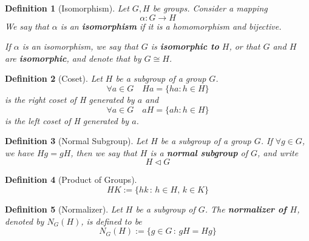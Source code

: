 \documentclass[9pt,landscape,a4paper]{article}
\newcommand{\hldefn}[1]{\textcolor{base16-eighties-magenta}{\textbf{#1}}}
\newcommand{\hlnoteb}[1]{\textcolor{base16-eighties-magenta}{\textbf{#1}}}
\theoremstyle{empty}
\newtheorem{defn}{Definition}
\begin{document}
\begin{multicols*}{5}
\begin{defn}[Isomorphism]
\label{defn:isomorphism}
  Let $G, H$ be groups. Consider a mapping
  \begin{equation*}
    \alpha: G \to H
  \end{equation*}
  We say that $\alpha$ is an \hlnoteb{isomorphism} if it is a homomorphism and bijective.

  If $\alpha$ is an isomorphism, we say that $G$ is \hldefn{isomorphic to} $H$, or that $G$ and $H$ are \hldefn{isomorphic}, and denote that by $G \cong H$.
\end{defn}

\begin{defn}[Coset]
\label{defn:coset}
  Let $H$ be a subgroup of a group $G$.
  \begin{equation*}
    \forall a \in G \quad Ha = \{ha : h \in H\}
  \end{equation*}
  is the right coset of H generated by $a$ and
  \begin{equation*}
    \forall a \in G \quad aH = \{ah : h \in H\}
  \end{equation*}
  is the left coset of H generated by $a$.
\end{defn}

\begin{defn}[Normal Subgroup]
\label{defn:normal_subgroup}
  Let $H$ be a subgroup of a group $G$. If $\forall g \in G$, we have $Hg = gH$, then we say that $H$ is a \hlnoteb{normal subgroup} of $G$, and write
  \begin{equation*}
    H \triangleleft G
  \end{equation*}
\end{defn}

\begin{defn}[Product of Groups]
\label{defn:product_of_groups}
  \begin{equation*}
    HK := \{ hk \, : \, h \in H, \, k \in K \}
  \end{equation*}
\end{defn}

\begin{defn}[Normalizer]
\label{defn:normalizer}
  Let $H$ be a subgroup of $G$. The \hlnoteb{normalizer of $H$}, denoted by $N_G(H)$, is defined to be
  \begin{equation*}
    N_G(H) := \{ g \in G \, : \, gH = Hg \}
  \end{equation*}
\end{defn}


\end{multicols*}
\end{document}
